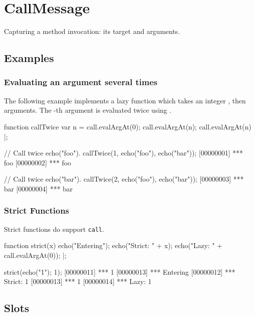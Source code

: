 \section{CallMessage}
Capturing a method invocation: its target and arguments.

\subsection{Examples}
\subsubsection{Evaluating an argument several times}
\label{sec:std-callmsg-examples-several}

The following example implements a lazy function which takes an
integer , then arguments.  The -th argument is evaluated
twice using .

\begin{urbiscript}[firstnumber=1]
function callTwice
{
  var n = call.evalArgAt(0);
  call.evalArgAt(n);
  call.evalArgAt(n)
} |;

// Call twice echo("foo").
callTwice(1, echo("foo"), echo("bar"));
[00000001] *** foo
[00000002] *** foo

// Call twice echo("bar").
callTwice(2, echo("foo"), echo("bar"));
[00000003] *** bar
[00000004] *** bar
\end{urbiscript}


\subsubsection{Strict Functions}

Strict functions do support \lstinline|call|.

\begin{urbiscript}
function strict(x)
{
  echo("Entering");
  echo("Strict: " + x);
  echo("Lazy:   " + call.evalArgAt(0));
} |;

strict({echo("1"); 1});
[00000011] *** 1
[00000013] *** Entering
[00000012] *** Strict: 1
[00000013] *** 1
[00000014] *** Lazy:   1
\end{urbiscript}


\subsection{Slots}

